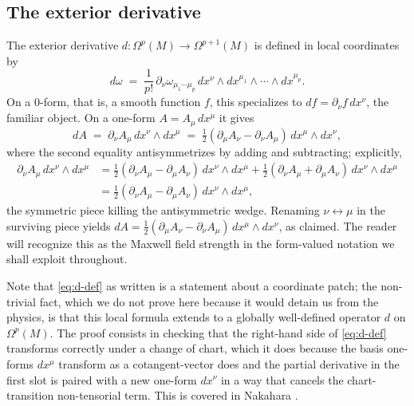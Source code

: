\subsection{The exterior derivative}

The exterior derivative $d : \Omega^p(M) \to \Omega^{p+1}(M)$ is defined in local coordinates by
\begin{equation}\label{eq:d-def}
d\omega \;=\; \frac{1}{p!}\,\partial_\nu \omega_{\mu_1\cdots\mu_p}\,dx^\nu \wedge dx^{\mu_1}\wedge\cdots\wedge dx^{\mu_p}.
\end{equation}
On a 0-form, that is, a smooth function $f$, this specializes to $df = \partial_\nu f\, dx^\nu$, the familiar object. On a one-form $A = A_\mu\,dx^\mu$ it gives
\begin{equation*}
dA \;=\; \partial_\nu A_\mu\, dx^\nu \wedge dx^\mu \;=\; \tfrac{1}{2}(\partial_\mu A_\nu - \partial_\nu A_\mu)\,dx^\mu \wedge dx^\nu,
\end{equation*}
where the second equality antisymmetrizes by adding and subtracting; explicitly,
\begin{align*}
\partial_\nu A_\mu\, dx^\nu\wedge dx^\mu
&= \tfrac{1}{2}(\partial_\nu A_\mu - \partial_\mu A_\nu)\,dx^\nu\wedge dx^\mu + \tfrac{1}{2}(\partial_\nu A_\mu + \partial_\mu A_\nu)\,dx^\nu\wedge dx^\mu \\
&= \tfrac{1}{2}(\partial_\nu A_\mu - \partial_\mu A_\nu)\,dx^\nu\wedge dx^\mu,
\end{align*}
the symmetric piece killing the antisymmetric wedge. Renaming $\nu\leftrightarrow\mu$ in the surviving piece yields $dA = \tfrac{1}{2}(\partial_\mu A_\nu - \partial_\nu A_\mu)\,dx^\mu\wedge dx^\nu$, as claimed. The reader will recognize this as the Maxwell field strength in the form-valued notation we shall exploit throughout.

\medskip

\noindent Note that \eqref{eq:d-def} as written is a statement about a coordinate patch; the non-trivial fact, which we do not prove here because it would detain us from the physics, is that this local formula extends to a globally well-defined operator $d$ on $\Omega^p(M)$. The proof consists in checking that the right-hand side of \eqref{eq:d-def} transforms correctly under a change of chart, which it does because the basis one-forms $dx^\mu$ transform as a cotangent-vector does and the partial derivative in the first slot is paired with a new one-form $dx^\nu$ in a way that cancels the chart-transition non-tensorial term. This is covered in Nakahara \cite{Nakahara2003GTP}.

